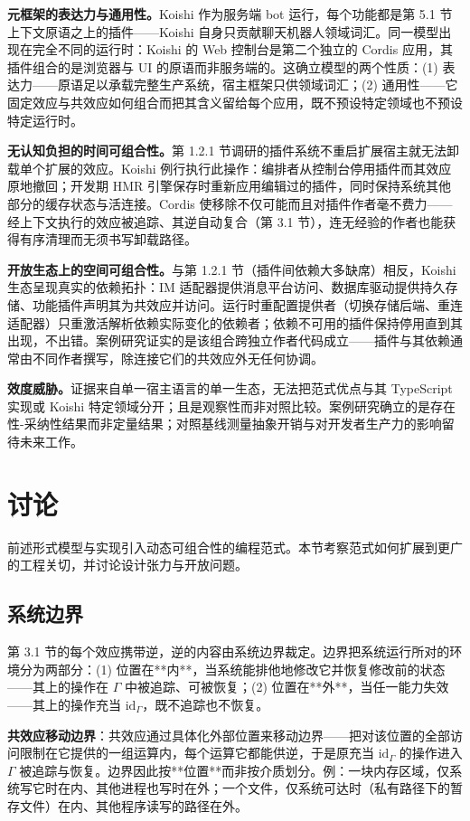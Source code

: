 \documentclass[11pt,a4paper]{article}
\theoremstyle{plain}
\theoremstyle{definition}
\theoremstyle{remark}
\begin{document}
\textbf{元框架的表达力与通用性。}Koishi 作为服务端 bot 运行，每个功能都是第 5.1 节上下文原语之上的插件——Koishi 自身只贡献聊天机器人领域词汇。同一模型出现在完全不同的运行时：Koishi 的 Web 控制台是第二个独立的 Cordis 应用，其插件组合的是浏览器与 UI 的原语而非服务端的。这确立模型的两个性质：(1) 表达力——原语足以承载完整生产系统，宿主框架只供领域词汇；(2) 通用性——它固定效应与共效应如何组合而把其含义留给每个应用，既不预设特定领域也不预设特定运行时。

\textbf{无认知负担的时间可组合性。}第 1.2.1 节调研的插件系统不重启扩展宿主就无法卸载单个扩展的效应。Koishi 例行执行此操作：编排者从控制台停用插件而其效应原地撤回；开发期 HMR 引擎保存时重新应用编辑过的插件，同时保持系统其他部分的缓存状态与活连接。Cordis 使移除不仅可能而且对插件作者毫不费力——经上下文执行的效应被追踪、其逆自动复合（第 3.1 节），连无经验的作者也能获得有序清理而无须书写卸载路径。

\textbf{开放生态上的空间可组合性。}与第 1.2.1 节（插件间依赖大多缺席）相反，Koishi 生态呈现真实的依赖拓扑：IM 适配器提供消息平台访问、数据库驱动提供持久存储、功能插件声明其为共效应并访问。运行时重配置提供者（切换存储后端、重连适配器）只重激活解析依赖实际变化的依赖者；依赖不可用的插件保持停用直到其出现，不出错。案例研究证实的是该组合跨独立作者代码成立——插件与其依赖通常由不同作者撰写，除连接它们的共效应外无任何协调。

\textbf{效度威胁。}证据来自单一宿主语言的单一生态，无法把范式优点与其 TypeScript 实现或 Koishi 特定领域分开；且是观察性而非对照比较。案例研究确立的是存在性-采纳性结果而非定量结果；对照基线测量抽象开销与对开发者生产力的影响留待未来工作。

\section{讨论}

前述形式模型与实现引入动态可组合性的编程范式。本节考察范式如何扩展到更广的工程关切，并讨论设计张力与开放问题。

\subsection{系统边界}

第 3.1 节的每个效应携带逆，逆的内容由系统边界裁定。边界把系统运行所对的环境分为两部分：(1) 位置在**内**，当系统能排他地修改它并恢复修改前的状态——其上的操作在 $\Gamma$ 中被追踪、可被恢复；(2) 位置在**外**，当任一能力失效——其上的操作充当 $\mathrm{id}_\Gamma$，既不追踪也不恢复。

\textbf{共效应移动边界}：共效应通过具体化外部位置来移动边界——把对该位置的全部访问限制在它提供的一组运算内，每个运算它都能供逆，于是原充当 $\mathrm{id}_\Gamma$ 的操作进入 $\Gamma$ 被追踪与恢复。边界因此按**位置**而非按介质划分。例：一块内存区域，仅系统写它时在内、其他进程也写时在外；一个文件，仅系统可达时（私有路径下的暂存文件）在内、其他程序读写的路径在外。
\end{document}
